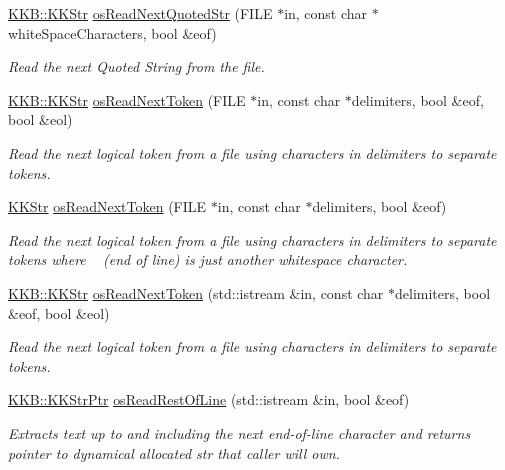 \begin{DoxyCompactItemize}
\hyperlink{class_k_k_b_1_1_k_k_str}{K\+K\+B\+::\+K\+K\+Str} \hyperlink{namespace_k_k_b_a6a8f791e61447398c2dc6249326f348b}{os\+Read\+Next\+Quoted\+Str} (F\+I\+LE $\ast$in, const char $\ast$white\+Space\+Characters, bool \&eof)
\begin{DoxyCompactList}\small\item\em Read the next Quoted String from the file. \end{DoxyCompactList}\item 
\hyperlink{class_k_k_b_1_1_k_k_str}{K\+K\+B\+::\+K\+K\+Str} \hyperlink{namespace_k_k_b_a6012e8136571d88dd794f8b5cf5ff574}{os\+Read\+Next\+Token} (F\+I\+LE $\ast$in, const char $\ast$delimiters, bool \&eof, bool \&eol)
\begin{DoxyCompactList}\small\item\em Read the next logical token from a file using characters in \textquotesingle{}delimiters\textquotesingle{} to separate tokens. \end{DoxyCompactList}\item 
\hyperlink{class_k_k_b_1_1_k_k_str}{K\+K\+Str} \hyperlink{namespace_k_k_b_a029c5b762f29ccb9570b3dc0cdd2ffe7}{os\+Read\+Next\+Token} (F\+I\+LE $\ast$in, const char $\ast$delimiters, bool \&eof)
\begin{DoxyCompactList}\small\item\em Read the next logical token from a file using characters in \textquotesingle{}delimiters\textquotesingle{} to separate tokens where \textquotesingle{}~\newline
\textquotesingle{}(end of line) is just another whitespace character. \end{DoxyCompactList}\item 
\hyperlink{class_k_k_b_1_1_k_k_str}{K\+K\+B\+::\+K\+K\+Str} \hyperlink{namespace_k_k_b_ac46fbb9468a356eb53b625ef461c0bb4}{os\+Read\+Next\+Token} (std\+::istream \&in, const char $\ast$delimiters, bool \&eof, bool \&eol)
\begin{DoxyCompactList}\small\item\em Read the next logical token from a file using characters in \textquotesingle{}delimiters\textquotesingle{} to separate tokens. \end{DoxyCompactList}\item 
\hyperlink{namespace_k_k_b_a9adbef5a6b3be0867f5570df2a08f388}{K\+K\+B\+::\+K\+K\+Str\+Ptr} \hyperlink{namespace_k_k_b_a88c95cee7b3dd5c93ab443b2ec20862c}{os\+Read\+Rest\+Of\+Line} (std\+::istream \&in, bool \&eof)
\begin{DoxyCompactList}\small\item\em Extracts text up to and including the next end-\/of-\/line character and returns pointer to dynamical allocated str that caller will own. \end{DoxyCompactList}\item 

\end{DoxyCompactItemize}
